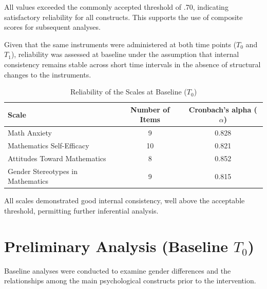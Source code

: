 All values exceeded the commonly accepted threshold of .70, indicating satisfactory reliability for all constructs. This supports the use of composite scores for subsequent analyses.

Given that the same instruments were administered at both time points ($T_0$ and $T_1$), reliability was assessed at baseline under the assumption that internal consistency remains stable across short time intervals in the absence of structural changes to the instruments.
\begin{table}[htbp]
  \centering
  \caption{Reliability of the Scales at Baseline ($T_0$)}
  \label{tab:Cronbach_alpha}
  \vspace{0.3cm}
  \begin{tabular}{lcc}
    \toprule
    Scale & Number of Items & Cronbach's alpha ($\alpha$) \\
    \midrule
    Math Anxiety & 9 & 0.828 \\
    Mathematics Self-Efficacy & 10 & 0.821 \\
    Attitudes Toward Mathematics & 8 & 0.852 \\
    Gender Stereotypes in Mathematics & 9 & 0.815 \\
    \bottomrule
  \end{tabular}
\end{table}
All scales demonstrated good internal consistency, well above the acceptable threshold, permitting further inferential analysis.

\section{Preliminary Analysis (Baseline $T_0$)}
Baseline analyses were conducted to examine gender differences and the relationships among the main psychological constructs prior to the intervention.

